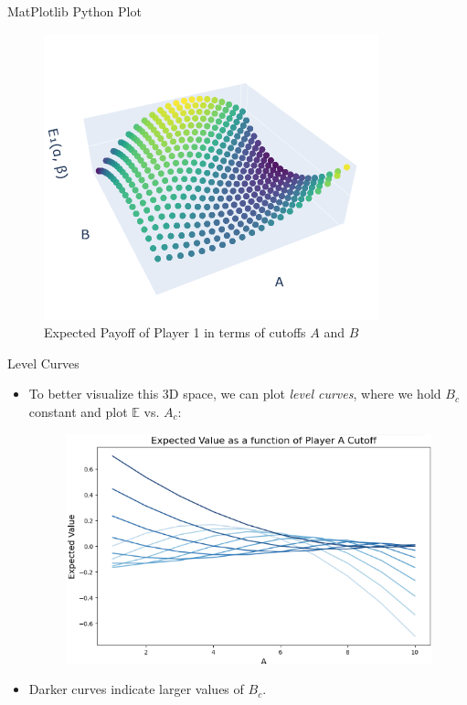 \documentclass[aspectratio=169]{beamer}
\begin{document}
\begin{frame}{MatPlotlib Python Plot}
    \begin{figure}
        \centering
        \includegraphics[scale=0.8]{3dplot.png}
        \caption{Expected Payoff of Player 1 in terms of cutoffs $A$ and $B$}
        \label{fig:enter-label}
    \end{figure}
\end{frame}
\begin{frame}{Level Curves}
    \begin{itemize}
        \item To better visualize this 3D space, we can plot \textit{level curves}, where we hold $B_c$ constant and plot $\mathbb{E}$ vs. $A_c$:
\begin{figure}
        \centering
        \includegraphics[scale=0.5]{levelcurves.png}
    \end{figure} \item Darker curves indicate larger values of $B_c.$
        \end{itemize}
\end{frame}
\end{document}
